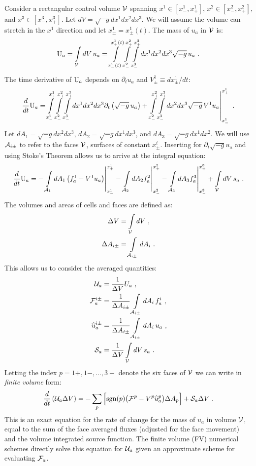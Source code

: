 Consider a rectangular control volume $\VV$ spanning $x^1\in [x^1_-, x^1_+]$,  $x^2\in [x^2_-, x^2_+]$, and  $x^3\in [x^3_-, x^3_+]$.  Let $dV=\sqrt{-g}dx^1dx^2dx^3$.  We will assume the volume can stretch in the $x^1$ direction and let $x^1_\pm = x^1_\pm(t)$.  The mass of $u_a$ in $\VV$ is:
\begin{equation}
	\UUU_a = \intop_\VV dV\, u_a = \int \limits_{x^1_-(t)}^{x^1_+(t)} \int \limits_{x^2_-}^{x^2_+} \int \limits_{x^3_-}^{x^3_+} dx^1dx^2dx^3 \sqrt{-g}\, u_a\ .
\end{equation}
The time derivative of $\UUU_a$ depends on $\partial_t u_a$ and $V^1_\pm \equiv d x^1_\pm /dt$:
 \begin{equation}
 \frac{d}{dt}\UUU_a = \int \limits_{x^1_-}^{x^1_+} \int \limits_{x^2_-}^{x^2_+} \int \limits_{x^3_-}^{x^3_+} dx^1dx^2dx^3 \partial_t\left(\sqrt{-g}\, u_a\right) + \left .  \int \limits_{x^2_-}^{x^2_+} \int \limits_{x^3_-}^{x^3_+} dx^2dx^3 \sqrt{-g}\, V^1  u_a\right |^{x^1_+}_{x^1_-}\ .
 \end{equation}
 Let $dA_1 =\sqrt{-g} dx^2 dx^3$, $dA_2 = \sqrt{-g}dx^1 dx^3$, and $dA_3 = \sqrt{-g}dx^1dx^2$.   We will use $\AA_{i\pm}$ to refer to the faces $\VV$, surfaces of constant $x^i_\pm$. Inserting  for $\partial_t \sqrt{-g} u_a$ and using Stoke's Theorem allows us to arrive at the integral equation:
 \begin{equation}
	\frac{d}{dt} \UUU_a = -\left .\intop_{\AA_1}dA_1 \left(f^1_a - V^1u_a\right) \right |_{x^1_-}^{x^1_+} -\left .\intop_{\AA_2}dA_2 f^2_a \right |_{x^2_-}^{x^2_+} -\left .\intop_{\AA_3}dA_3 f^3_a \right |_{x^3_-}^{x^3_+} +  \intop_\VV dV\, s_a\ . \eqlabel{integralform}
\end{equation}
The volumes and areas of cells and faces are defined as:
\begin{align}
	\Delta V &= \intop_\VV dV \ , \\
	\Delta A_{i\pm} &= \intop_{\AA_{i\pm}} dA_i \ .
\end{align}
This allows us to consider the averaged quantities:
\begin{align}
	\UU_a &= \frac{1}{\Delta V} U_a\ , \\
	\FF^{i\pm}_a &= \frac{1}{\Delta A_{i\pm}}  \intop_{\AA_{i\pm}} dA_i\, f^i_a \ ,  \\
	\widehat{u}_a^{i\pm} &=  \frac{1}{\Delta A_{i\pm}}    \intop_{\AA_{i\pm}} dA_i \, u_a\ , \\
	\SS_a &= \frac{1}{\Delta V} \intop_\VV dV\, s_a\ .
\end{align}
Letting the index $p=  1+, 1-, \dots, 3-$ denote the six faces of $\VV$ we can write  in \emph{finite volume} form:
\begin{equation}
\frac{d}{dt}\left( \UU_a \Delta V\right) = -\sum_{p}\Big[\sgn(p)\big(\FF^{p} - V^{p} \widehat u_a^{p}\big)\Delta A_{p}\Big] + \SS_a \Delta V\ . \eqlabel{FVform}
\end{equation}
This is an exact equation for the rate of change for the mass of $u_a$ in volume $\VV$, equal to the sum of the face averaged fluxes (adjusted for the face movement) and the volume integrated source function.  The finite volume (FV) numerical schemes directly solve this equation for $\UU_a$ given an approximate scheme for evaluating $\FF_a$.


